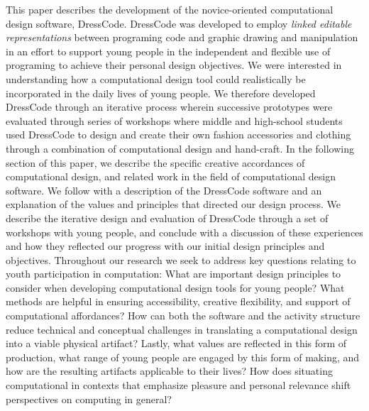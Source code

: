 \documentclass{sigchi}
\begin{document}
This paper describes the development of the novice-oriented computational design software, DressCode. DressCode was developed to employ \textit{linked editable representations} between programing code and graphic drawing and manipulation in an effort to support young people in the independent and flexible use of programing to achieve their personal design objectives. We were interested in understanding how a computational design tool could realistically be incorporated in the daily lives of young people. We therefore developed DressCode through an iterative process wherein successive prototypes were evaluated through series of workshops where middle and high-school students used DressCode to design and create their own fashion accessories and clothing through a combination of computational design and hand-craft. In the following section of this paper, we describe the specific creative accordances of computational design, and related work in the field of computational design software. We follow with a description of the DressCode software and an explanation of the values and principles that directed our design process. We describe the iterative design and evaluation of DressCode through a set of workshops with young people, and conclude with a discussion of these experiences and how they reflected our progress with our initial design principles and objectives. Throughout our research we seek to address key questions relating to youth participation in computation: What are important design principles to consider when developing computational design tools for young people? What methods are helpful in ensuring accessibility, creative flexibility, and support of computational affordances? How can both the software and the activity structure reduce technical and conceptual challenges in translating a computational design into a viable physical artifact? Lastly, what values are reflected in this form of production, what range of young people are engaged by this form of making, and how are the resulting artifacts applicable to their lives? How does situating computational in contexts that emphasize pleasure and personal relevance shift perspectives on computing in general? 
\end{document}
